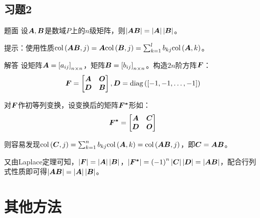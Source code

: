 \documentclass[9pt,xcolor=svgnames]{beamer} %
\begin{document}
\subsection*{习题2}
\begin{frame}
    \begin{block}{题面}
        设\(\mata,\matb\)是数域\(P\)上的\(n\)级矩阵，则\(\abs{\mata\matb}=\abs{\mata}\abs{\matb}\)。

        提示：使用性质\(\col{\mata\matb}{j}=\mata\col{\matb}{j}=\sum_{k=1}^lb_{kj}\col{\mata}{k}\)。
    \end{block}
    \pause
    \begin{block}{解答}
        设矩阵\(\mata=\mat{a_{ij}}_{n\times n}\)，矩阵\(\matb=\mat{b_{ij}}_{n\times n}\)。构造\(2n\)阶方阵\(\matf\)：
        \begin{equation*}
            \matf=
            \begin{bmatrix}
                \mata & \mato \\\matd&\matb
            \end{bmatrix},\matd=\diag{\mat{-1,-1,\dots,-1}}
        \end{equation*}

        对\(\matf\)作初等列变换，设变换后的矩阵\(\matfstar\)形如：
        \begin{equation*}
            \matfstar=\begin{bmatrix}\mata&\matc\\\matd&\mato\end{bmatrix}
        \end{equation*}

        则容易发现\(\col{\matc}{j}=\sum_{k=1}^nb_{kj}\col{\mata}{k}=\col{\mata\matb}{j}\)，即\(\matc=\mata\matb\)。

        又由Laplace定理可知，\(\abs{\matf}=\abs{\mata}\abs{\matb}\)，\(\abs{\matfstar}=\spar{-1}^n\abs{\matc}\abs{\matd}=\abs{\mata\matb}\)，配合行列式性质即可得\(\abs{\mata\matb}=\abs{\mata}\abs{\matb}\)。
    \end{block}
\end{frame}

\section{其他方法}
\end{document}
